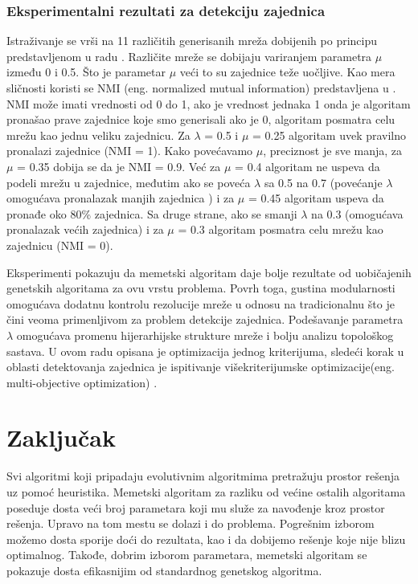 \documentclass[a4paper]{article}
\begin{document}
\subsubsection{Eksperimentalni rezultati za detekciju zajednica}

Istraživanje se vrši na 11 različitih generisanih mreža dobijenih po principu predstavljenom u radu \cite{lanci} . Različite mreže se dobijaju variranjem parametra $\mu$ između 0 i 0.5. Što je parametar  $\mu$ veći to su zajednice teže uočljive. Kao mera sličnosti koristi se NMI (eng. normalized mutual information) predstavljena u \cite{danon}. NMI može imati vrednosti od 0 do 1, ako je vrednost jednaka 1 onda je algoritam pronašao prave zajednice koje smo generisali ako je 0, algoritam posmatra celu mrežu kao jednu veliku zajednicu.
Za  $\lambda$ = 0.5 i $\mu$ = 0.25 algoritam uvek pravilno pronalazi zajednice (NMI = 1). Kako povećavamo $\mu$, preciznost je sve manja, za $\mu$ = 0.35 dobija se da je NMI = 0.9. Već za $\mu$ = 0.4 algoritam ne uspeva da podeli mrežu u zajednice, međutim ako se poveća $\lambda$ sa 0.5 na 0.7 (povećanje $\lambda$ omogućava pronalazak manjih zajednica ) i za $\mu$ = 0.45 algoritam uspeva da pronađe oko 80\% zajednica. Sa druge strane, ako se smanji  $\lambda$ na 0.3 (omogućava pronalazak većih zajednica) i za $\mu$ = 0.3 algoritam posmatra celu mrežu kao zajednicu (NMI = 0).


Eksperimenti pokazuju da memetski algoritam daje bolje rezultate od uobičajenih genetskih algoritama za ovu vrstu problema. Povrh toga, gustina modularnosti omogućava dodatnu kontrolu rezolucije mreže u odnosu na tradicionalnu što je čini  veoma primenljivom za problem detekcije zajednica. Podešavanje parametra $\lambda$ omogućava promenu  hijerarhijske strukture mreže i bolju analizu topološkog sastava. U ovom radu opisana je optimizacija jednog kriterijuma, sledeći korak u oblasti detektovanja zajednica je ispitivanje višekriterijumske optimizacije(eng. multi-objective optimization)\cite{gong} .

















\section{Zaključak}
\label{sec:zakljucak}

Svi algoritmi koji pripadaju evolutivnim algoritmima pretražuju prostor rešenja uz pomoć heuristika. Memetski algoritam za razliku od većine ostalih algoritama poseduje dosta veći broj parametara koji mu služe za navođenje kroz prostor rešenja. Upravo na tom mestu se dolazi i do problema. Pogrešnim izborom možemo dosta sporije doći do rezultata, kao i da dobijemo rešenje koje nije blizu optimalnog. Takođe, dobrim izborom parametara, memetski algoritam se pokazuje dosta efikasnijim od standardnog genetskog algoritma.

\appendix
 

\end{document}
